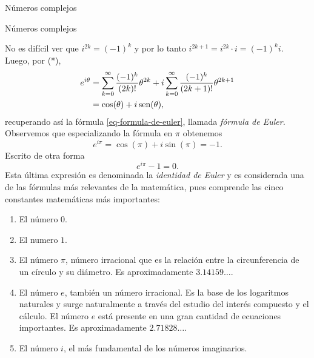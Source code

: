 \begin{chapter}{N\'umeros complejos}
\begin{section}{N\'umeros complejos}
\begin{observacion*}
            No es difícil ver que $i^{2k} = (-1)^k$ y por lo tanto $i^{2k+1} = i^{2k}\cdot i = (-1)^ki $. Luego, por (*), 
            \begin{align*}
                e^{i\theta} &=  \sum_{k=0}^{\infty} \frac{(-1)^k}{(2k)!}\theta^{2k}  + i\sum_{k=0}^{\infty} \frac{ (-1)^k}{(2k+1)!}\theta^{2k+1} \\
                &=\cos(\theta) + i \operatorname{sen}(\theta), 
            \end{align*}
            recuperando así  la fórmula \eqref{eq-formula-de-euler}, llamada \emph{fórmula de Euler.} Observemos que especializando la fórmula en $\pi$ obtenemos 
            \begin{equation*}
                    e^{i\pi} = \cos(\pi) + i\sin(\pi) = -1.
            \end{equation*}
            Escrito de otra forma
            \begin{equation}
                e^{i\pi} -1 =0.
            \end{equation}
            Esta última expresión es denominada la \emph{identidad de Euler} y es considerada una de las fórmulas más relevantes de la matemática, pues comprende las cinco constantes matemáticas más importantes: 
            \begin{enumerate}
                \item El número \boldmath${0}$.
                \item El numero \boldmath${1}$.
                \item El número \boldmath${\pi}$, número irracional  que es la relación entre la circunferencia de un círculo y su diámetro. Es aproximadamente $3.14159\ldots$.
                \item El número \boldmath${e}$, también un número irracional. Es la base de los logaritmos naturales y surge naturalmente a través del estudio del interés compuesto y el cálculo. El número $e$ está presente en una gran cantidad de ecuaciones importantes. Es aproximadamente $2.71828\ldots$.
                \item El número \boldmath$i$, el más fundamental de los números imaginarios.
            \end{enumerate}
        \end{observacion*}
        
    \end{section}	
\end{chapter}





